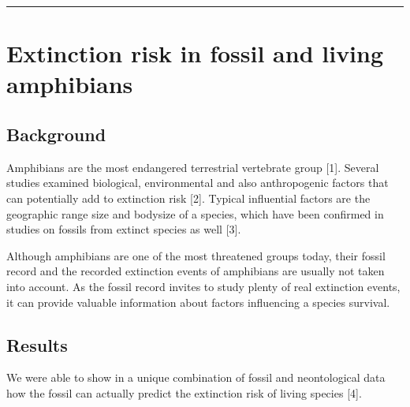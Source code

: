 \documentclass[]{article}
\begin{document}
\begin{center}\rule{0.5\linewidth}{\linethickness}\end{center}

\section{Extinction risk in fossil and living
amphibians}\label{extinction-risk-in-fossil-and-living-amphibians}

\subsection{Background}\label{background}

Amphibians are the most endangered terrestrial vertebrate group {[}1{]}.
Several studies examined biological, environmental and also
anthropogenic factors that can potentially add to extinction risk
{[}2{]}. Typical influential factors are the geographic range size and
bodysize of a species, which have been confirmed in studies on fossils
from extinct species as well {[}3{]}.

Although amphibians are one of the most threatened groups today, their
fossil record and the recorded extinction events of amphibians are
usually not taken into account. As the fossil record invites to study
plenty of real extinction events, it can provide valuable information
about factors influencing a species survival.

\subsection{Results}\label{results-1}

We were able to show in a unique combination of fossil and neontological
data how the fossil can actually predict the extinction risk of living
species {[}4{]}.
\end{document}
